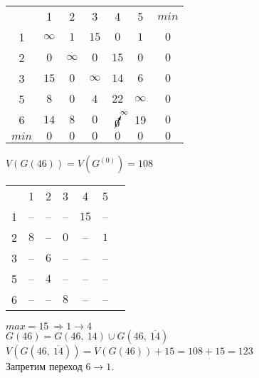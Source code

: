 \begin{table}[H]
\begin{center}
	\def\tabcolsep{18pt}
	\def\arraystretch{1.5}
	\fontsize{13}{14}\selectfont
	\begin{tabular}{|c||c|c|c|c|c||c|}
		\hline 
	  	& 1 & 2 & 3 & 4 & 5 & $min$\\ 
		\hhline{|=#=|=|=|=|=#=|} 
		1 & $\infty$ & $1$ & $15$ & $0$ & $1$ & $0$ \\ 
		\hline 
		2 & $0$ & $\infty$ & $0$ & $15$ & $0$ & $0$ \\ 
		\hline 
		3 & $15$ & $0$ & $\infty$ & $14$ & $6$ & $0$ \\ 
		\hline 
		5 & $8$ & $0$ & $4$ & $22$ & $\infty$ & $0$ \\ 
		\hline 
		6 & $14$ & $8$ & $0$ & $\cancelto{\infty}{0}$ & 19 & $0$ \\
		\hhline{|=#=|=|=|=|=#=|}
		$min$ & $0$ & $0$ & $0$ & $0$ & $0$ & $0$ \\
		\hline
	\end{tabular}  
\end{center}
\end{table}

\noindent $V(G(46)) = V(G^{(0)}) = 108$

\begin{table}[H]
\begin{center}
	\def\tabcolsep{18pt}
	\def\arraystretch{1.5}
	\fontsize{13}{14}\selectfont
	\begin{tabular}{|c||c|c|c|c|c|c|}
		\hline 
	  	& 1 & 2 & 3 & 4 & 5 \\ 
		\hhline{|=#=|=|=|=|=|} 
		1 & -- & -- & -- & \cellcolor{pink} $15$ & -- \\ 
		\hline 
		2 & $8$ & -- & $0$ & -- & $1$ \\ 
		\hline 
		3 & -- & $6$ & -- & -- & -- \\ 
		\hline 
		5 & -- & $4$ & -- & -- & -- \\ 
		\hline 
		6 & -- & -- & $8$ & -- & -- \\
		\hline
	\end{tabular}  
\end{center}
\end{table}

\noindent $max = 15\ \Rightarrow 1 \rightarrow 4$\\
$G(46) = G(46,\ 14) \cup G(46,\ \overline{14})$\\
$V(G(46,\ \overline{14})) = V(G(46)) + 15 = 108 + 15 = 123$\\
Запретим переход $6 \rightarrow 1$.

